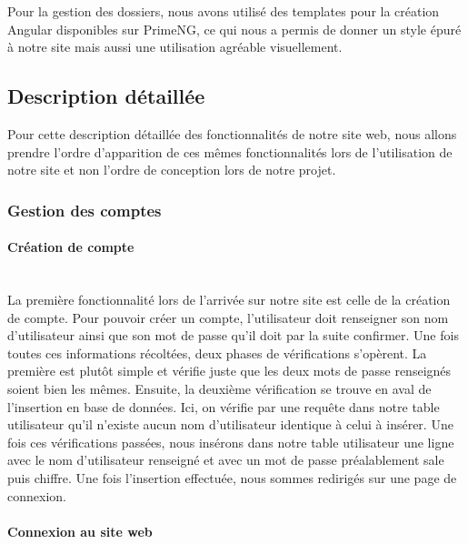 \documentclass[12pt,french]{article}
\begin{document}
Pour la gestion des dossiers, nous avons utilisé des templates pour la création Angular disponibles sur PrimeNG, ce qui nous a permis de donner un style épuré à notre site mais aussi une utilisation agréable visuellement.

\subsection{Description détaillée} 

Pour cette description détaillée des fonctionnalités de notre site web, nous allons prendre l'ordre d'apparition de ces mêmes fonctionnalités lors de l'utilisation de notre site et non l'ordre de conception lors de notre projet.
\subsubsection{Gestion des comptes}

\paragraph{Création de compte \\\\}

La première fonctionnalité lors de l'arrivée sur notre site est celle de la création de compte. Pour pouvoir créer un compte, l'utilisateur doit renseigner son nom d'utilisateur ainsi que son mot de passe qu'il doit par la suite confirmer. Une fois toutes ces informations récoltées, deux phases de vérifications s'opèrent. La première est plutôt simple et vérifie juste que les deux mots de passe renseignés soient bien les mêmes. Ensuite, la deuxième vérification se trouve en aval de l'insertion en base de données. Ici, on vérifie par une requête dans notre \gls{table} utilisateur qu'il n'existe aucun nom d'utilisateur identique à celui à insérer. Une fois ces vérifications passées, nous insérons dans notre \gls{table} utilisateur une ligne avec le nom d'utilisateur renseigné et avec un mot de passe préalablement \gls{sale} puis \gls{chiffre}. Une fois l'insertion effectuée, nous sommes redirigés sur une page de connexion.


\paragraph{Connexion au site web \\\\}
\end{document}
